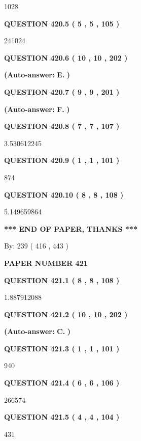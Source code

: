 \documentclass{ctexart}
\begin{document}
1028
  
  
{\textbf{\large{QUESTION
420.5 
 ( 5 , 5 , 105 )
}}}

241024
  
  
{\textbf{\large{QUESTION
420.6 
 ( 10 , 10 , 202 )
}}}
 
 
{\textbf{(Auto-answer:}}
{\textbf{\large{
E.}}}
{\textbf{)}}
 
 
  
  
{\textbf{\large{QUESTION
420.7 
 ( 9 , 9 , 201 )
}}}
 
 
{\textbf{(Auto-answer:}}
{\textbf{\large{
F.}}}
{\textbf{)}}
 
 
  
  
{\textbf{\large{QUESTION
420.8 
 ( 7 , 7 , 107 )
}}}

3.530612245
  
  
{\textbf{\large{QUESTION
420.9 
 ( 1 , 1 , 101 )
}}}

874
  
  
{\textbf{\large{QUESTION
420.10 
 ( 8 , 8 , 108 )
}}}

5.149659864
   
   
   
   
\vspace{1.0in} 
{\textbf{\large{ *** END OF PAPER, THANKS *** }}} 
   
   
\hspace{1.0in} By: 
 239 ( 416 ,  443 )
   
   
   
   
\newpage 
\setcounter{page}{ 
   421001 } 
   
   
 {\textbf{ \Large{ PAPER NUMBER  421  }}}
   
   
   
   
  
  
{\textbf{\large{QUESTION
421.1 
 ( 8 , 8 , 108 )
}}}

1.887912088
  
  
{\textbf{\large{QUESTION
421.2 
 ( 10 , 10 , 202 )
}}}
 
 
{\textbf{(Auto-answer:}}
{\textbf{\large{
C.}}}
{\textbf{)}}
 
 
  
  
{\textbf{\large{QUESTION
421.3 
 ( 1 , 1 , 101 )
}}}

940
  
  
{\textbf{\large{QUESTION
421.4 
 ( 6 , 6 , 106 )
}}}

266574
  
  
{\textbf{\large{QUESTION
421.5 
 ( 4 , 4 , 104 )
}}}

431
  
\end{document}
